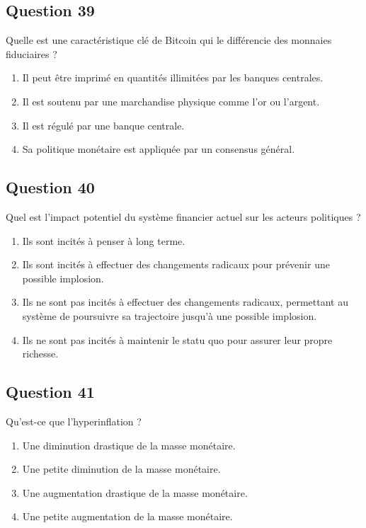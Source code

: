 \documentclass[12pt,a4paper]{article}
\begin{document}
\bigskip


\subsection*{Question 39}
Quelle est une caractéristique clé de Bitcoin qui le différencie des monnaies fiduciaires ?

\begin{enumerate}[label=\Alph*., leftmargin=*]
\item Il peut être imprimé en quantités illimitées par les banques centrales.
\item Il est soutenu par une marchandise physique comme l'or ou l'argent.
\item Il est régulé par une banque centrale.
\item Sa politique monétaire est appliquée par un consensus général.
\end{enumerate}

\bigskip


\subsection*{Question 40}
Quel est l'impact potentiel du système financier actuel sur les acteurs politiques ?

\begin{enumerate}[label=\Alph*., leftmargin=*]
\item Ils sont incités à penser à long terme.
\item Ils sont incités à effectuer des changements radicaux pour prévenir une possible implosion.
\item Ils ne sont pas incités à effectuer des changements radicaux, permettant au système de poursuivre sa trajectoire jusqu'à une possible implosion.
\item Ils ne sont pas incités à maintenir le statu quo pour assurer leur propre richesse.
\end{enumerate}

\bigskip


\subsection*{Question 41}
Qu'est-ce que l'hyperinflation ?

\begin{enumerate}[label=\Alph*., leftmargin=*]
\item Une diminution drastique de la masse monétaire.
\item Une petite diminution de la masse monétaire.
\item Une augmentation drastique de la masse monétaire.
\item Une petite augmentation de la masse monétaire.
\end{enumerate}
\end{document}
